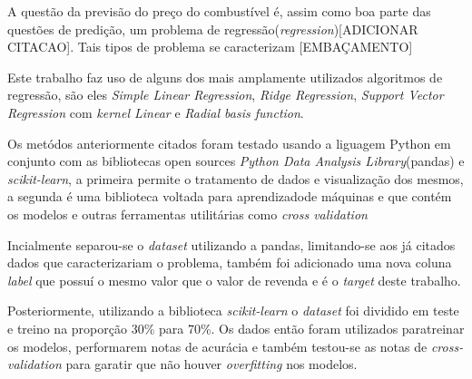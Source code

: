 
A questão da previsão do preço do combustível é, assim como boa parte das questões de predição, 
um problema de regressão(\textit{regression})[ADICIONAR CITACAO]. Tais tipos de problema se caracterizam
[EMBAÇAMENTO]

Este trabalho faz uso de alguns dos mais amplamente utilizados algoritmos de regressão,
são eles \textit{Simple Linear Regression}, \textit{Ridge Regression}, \textit{Support Vector Regression} com \textit{kernel Linear}
e \textit{Radial basis function}.

Os metódos anteriormente citados foram testado usando a liguagem Python em conjunto com as bibliotecas open sources
\textit{Python Data Analysis Library}(pandas) e \textit{scikit-learn}, a primeira permite o tratamento de dados e visualização dos mesmos,
a segunda é uma biblioteca voltada para aprendizadode máquinas e que contém os modelos e outras ferramentas utilitárias como
\textit{cross validation}

Incialmente separou-se o \textit{dataset} utilizando a pandas, limitando-se aos já citados
dados que caracterizariam o problema, também foi adicionado uma nova coluna \textit{label} que
possuí o mesmo valor que o valor de revenda e é o \textit{target} deste trabalho.

Posteriormente, utilizando a biblioteca \textit{scikit-learn} o \textit{dataset} foi dividido em 
teste e treino na proporção 30\% para 70\%. Os dados então foram utilizados
paratreinar os modelos, performarem notas de acurácia e também testou-se as notas
de \textit{cross-validation} para garatir que não houver \textit{overfitting} nos modelos.